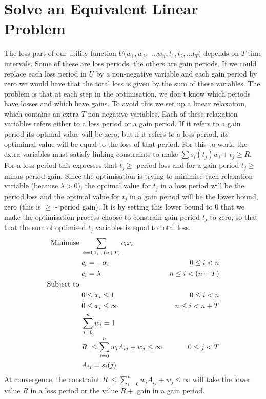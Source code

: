 \documentclass{article}
\begin{document}
\section{Solve an Equivalent Linear Problem}
The loss part of our utility function $U(w_1,w_2,$ $...w_n,t_1,t_2,...t_T)$ depends on $T$ time intervals. Some of these
are loss periods, the others are gain periods. If we could replace each loss period in $U$ by a non-negative variable and each gain period by
zero we would have that the total loss is given by the sum of these variables. The problem is that at each step in the optimisation,
we don't know which periods have losses and which have gains. To avoid this we set up a linear relaxation, which contains an extra $T$ non-negative variables. Each of these relaxation variables
refers either to a loss period or a gain period. If it refers to a gain period its optimal value will be zero, but if it refers to a loss period,
its optimimal value will be equal to the loss of that period. For this to work, the extra variables must satisfy
linking constraints to make $\sum s_i( t_j )w_i +t_j \ge R$. For a loss period this expresses that $t_j \ge$ period loss and for a gain period
$t_j \ge$ minus period gain. Since the optimisation is trying to minimise each relaxation variable (because $\lambda > 0$), the optimal value 
for $t_j$ in a loss period will be the period loss and the optimal value for $t_j$ in a gain period will be the lower bound, zero (this is $\ge$ - period gain).
It is by setting this lower bound to 0 that we make the optimisation process choose to constrain gain period 
$t_j$ to zero, so that that the sum of optimised $t_j$ variables is equal to total loss.
\begin{align}
    {\rm Minimise}\ & \sum_{i=0,1,...(n+T)} c_i x_i\cr
    & c_i=-\alpha_i &0\le i < n\cr
    &c_i =\lambda &n\le i < (n+T)\cr
    {\rm Subject\ to}\ &\cr& 0 \le x_i \le 1\ &0\le i < n\cr
    & 0 \le x_i \le \infty\ &n\le i < n+T\cr
    & \sum_{i=0}^n w_i = 1\cr
    & R\ \le\sum_{i=0}^n w_i A_{ij} + w_j \le\infty &0\le j < T\cr
    & A_{ij} = s_i(j)\cr
\end{align}
At convergence, the constraint $R\ \le\sum_{i=0}^n w_i A_{ij} + w_j \le\infty$ will take the lower value $R$ in a loss period or the value $R+$ gain in a gain period.
\end{document}
